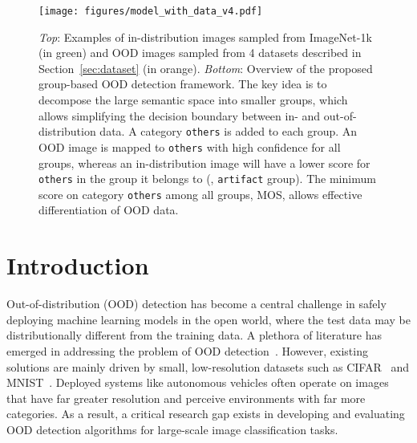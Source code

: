 \documentclass[final]{cvpr}
\begin{document}
\begin{figure*}[t]
    \centering
    \vspace{-0.2cm}
    \texttt{[image: figures/model\_with\_data\_v4.pdf]}
    \caption{\small \textit{Top}: Examples of in-distribution images sampled from ImageNet-1k (in {\textcolor{mygreen}{green}}) and  OOD images sampled from 4 datasets described in Section~\ref{sec:dataset} (in {\textcolor{myorange}{orange}}). \textit{Bottom}: Overview of the proposed group-based OOD detection framework. The key idea is to decompose the large semantic space into smaller groups, which allows simplifying the decision boundary between in- and out-of-distribution data. A category \texttt{others} is added to each group. An OOD image is mapped to \texttt{others} with high confidence for all groups, whereas an in-distribution image will have a lower score for \texttt{others} in the group it belongs to (\eg, \texttt{artifact} group). The minimum score on category \texttt{others} among all groups, MOS, allows effective differentiation of OOD data.  
}
    \vspace{-0.45cm}
    \label{fig:main_arch}
\end{figure*}

\vspace{-0.4cm}
\section{Introduction}
Out-of-distribution (OOD) detection has become a central challenge in safely deploying machine learning models in the open world, where the test data may be distributionally different from the training data. A plethora of literature has emerged in addressing the problem of OOD detection~\cite{bevandic2018discriminative,hein2019relu, hendrycks2016baseline,
lakshminarayanan2017simple,
lee2018simple,
liang2018enhancing, mohseni2020self, chen2020robust-new, hsu2020generalized, liu2020energy, lin2021mood}. However, existing solutions are mainly driven by small, low-resolution datasets such as CIFAR~\cite{krizhevsky2009learning} and MNIST~\cite{lecun2010mnist}. Deployed systems like autonomous vehicles often operate on images that have
far greater resolution and perceive environments with far
more categories. As a result, a critical research gap exists in developing and evaluating OOD detection algorithms for large-scale image classification tasks. 
\end{document}
